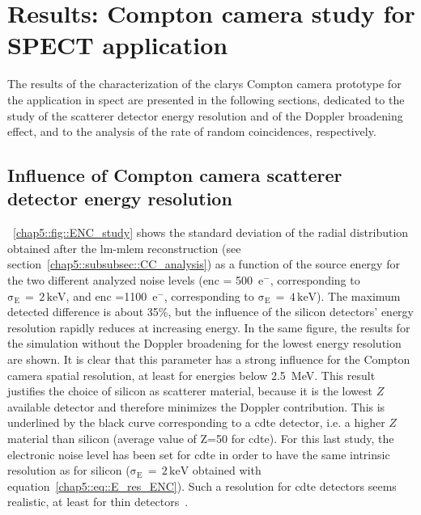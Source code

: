 \section{Results: Compton camera study for SPECT application}\label{chap5::sec::Results_CC_SPECT}
The results of the characterization of the \gls{clarys} Compton camera prototype for the application in \gls{spect} are presented in the following sections, dedicated to the study of the scatterer detector energy resolution and of the Doppler broadening effect, and to the analysis of the rate of random coincidences, respectively.

\subsection{Influence of Compton camera scatterer detector energy resolution}\label{chap5::subsec::Results_CC_SPECT_ENC}
\figurename~\ref{chap5::fig::ENC_study} shows the standard deviation of the radial distribution obtained after the \gls{lm-mlem} reconstruction (see section~\ref{chap5::subsubsec::CC_analysis}) as a function of the source energy for the two different analyzed noise levels (\gls{enc} = 500~e$^-$, corresponding to $\mathrm{\sigma_{E}\,=\,2\,keV}$, and \gls{enc} =1100~e$^-$, corresponding to $\mathrm{\sigma_{E}\,=\,4\,keV}$). The maximum detected difference is about 35\%, but the influence of the silicon detectors' energy resolution rapidly reduces at increasing energy. In the same figure, the results for the simulation without the Doppler broadening for the lowest energy resolution are shown. It is clear that this parameter has a strong influence for the Compton camera spatial resolution, at least for energies below 2.5~MeV. This result justifies the choice of silicon as scatterer material, because it is the lowest $Z$ available detector and therefore minimizes the Doppler contribution. This is underlined by the black curve corresponding to a \gls{cdte} detector, i.e. a higher $Z$ material than silicon (average value of Z=50 for \gls{cdte}). For this last study, the electronic noise level has been set for \gls{cdte} in order to have the same intrinsic resolution as for silicon ($\mathrm{\sigma_{E}\,=\,2\,keV}$ obtained with equation~\ref{chap5::eq::E_res_ENC}). Such a resolution for \gls{cdte} detectors seems realistic, at least for thin detectors~\parencite{Alharbi2018}.

